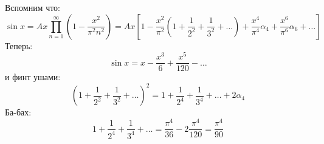 \documentclass[a4paper,10pt]{article} %
\begin{document}
	
	Вспомним что:
	$$
		\sin x = A x \prod\limits_{n = 1}^{\infty} \left(1 - \frac{x^2}{\pi^2 n^2}\right) =
		A x \left[
		1 -
		\frac{x^2}{\pi^2} \left(1 + \frac{1}{2^2} + \frac{1}{3^2} + \ldots \right) +
		\frac{x^4}{\pi^4} \alpha_4 + 
		\frac{x^6}{\pi^6} \alpha_6 + \ldots
		\right]
	$$
	Теперь:
	$$
		\sin x = x - \frac{x^3}{6} + \frac{x^5}{120} - \ldots
	$$
	и финт ушами:
	$$
		\left(1 + \frac{1}{2^2} + \frac{1}{3^2} + \ldots \right)^2 = 
		1 + \frac{1}{2^4} + \frac{1}{3^4} + \ldots + 2 \alpha_4
	$$
	Ба-бах:
	$$
		1 + \frac{1}{2^4} + \frac{1}{3^4} + \ldots = \frac{\pi^4}{36} - 2 \frac{\pi^4}{120} = \frac{\pi^4}{90}
	$$
\end{document}

